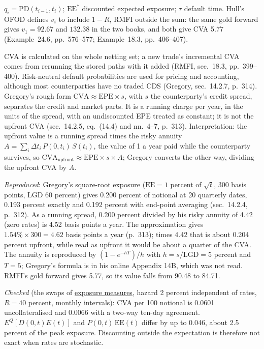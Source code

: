 \begin{qfmethod}
 $q_i=\mathrm{PD}(t_{i-1},t_i)$; $\mathrm{EE}^*$ discounted expected exposure; $\tau$ default time. Hull's OFOD defines $v_i$ to include $1-R$, RMFI outside the sum: the same gold forward gives $v_1=92.67$ and $132.38$ in the two books, and both give CVA 5.77 (Example~24.6, pp.~576--577; Example~18.3, pp.~406--407).

 CVA is calculated on the whole netting set; a new trade's incremental CVA comes from rerunning the stored paths with it added (RMFI, sec.~18.3, pp.~399--400). Risk-neutral default probabilities are used for pricing and accounting, although most counterparties have no traded CDS (Gregory, sec.~14.2.7, p.~314). Gregory's rough form $\mathrm{CVA}\approx\mathrm{EPE}\times s$, with $s$ the counterparty's credit spread, separates the credit and market parts. It is a running charge per year, in the units of the spread, with an undiscounted EPE treated as constant; it is not the upfront CVA (sec.~14.2.5, eq.~(14.4) and nn.~4--7, p.~313). Interpretation: the upfront value is a running spread times the risky annuity $A=\sum_i\Delta t_i\,P(0,t_i)\,S(t_i)$, the value of 1 a year paid while the counterparty survives, so $\mathrm{CVA}_{\text{upfront}}\approx\mathrm{EPE}\times s\times A$; Gregory converts the other way, dividing the upfront CVA by $A$.

 \emph{Reproduced}: Gregory's square-root exposure ($\mathrm{EE}=1$ percent of $\sqrt t$, 300 basis points, LGD 60 percent) gives 0.200 percent of notional at 20 quarterly dates, 0.193 percent exactly and 0.192 percent with end-point averaging (sec.~14.2.4, p.~312). As a running spread, 0.200 percent divided by his risky annuity of 4.42 (zero rates) is 4.52 basis points a year. The approximation gives $1.54\%\times300=4.62$ basis points a year (p.~313); times 4.42 that is about 0.204 percent upfront, while read as upfront it would be about a quarter of the CVA. The annuity is reproduced by $(1-e^{-hT})/h$ with $h=s/\mathrm{LGD}=5$ percent and $T=5$; Gregory's formula is in his online Appendix 14B, which was not read. RMFI's gold forward gives 5.77, so its value falls from 90.48 to 84.71.

\emph{Checked} (the swaps of \hyperref[def:counterparty-exposure-measures]{exposure measures}, hazard 2 percent independent of rates, $R=40$ percent, monthly intervals): CVA per 100 notional is 0.0601 uncollateralised and 0.0066 with a two-way ten-day agreement. $E^Q[D(0,t)E(t)]$ and $P(0,t)\,\mathrm{EE}(t)$ differ by up to 0.046, about 2.5 percent of the peak exposure. Discounting outside the expectation is therefore not exact when rates are stochastic.


\end{qfmethod}
